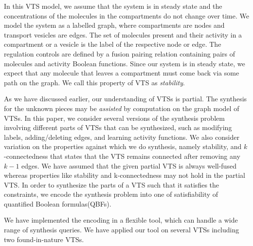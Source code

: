 %
In this VTS model, we assume that the system is in steady state and the
concentrations of the molecules in the compartments do not change over
time.
%
We model the system as a labelled graph, where compartments are nodes and
transport vesicles are edges.
%
The set of molecules present and their activity in a compartment or
a vesicle is the label of the respective node or edge.
%
The regulation controls are defined by a fusion pairing relation
containing pairs of molecules and activity
Boolean functions.
%
Since our system is in steady state, we expect that any molecule that
leaves a compartment must come back via some path on the graph.
%
We call this property of VTS as {\em stability}.

%
As we have discussed earlier, our understanding of VTSs is partial.
%
%
%
%
The synthesis for the unknown pieces may be {\em assisted} by computation on
the graph model of VTSs.
%
In this paper, we consider several versions of the synthesis problem
involving different parts of VTSs that can be synthesized, such as
modifying labels, adding/deleting edges, and learning activity functions.
%
We also consider variation on the properties against which we do
synthesis, namely stability, and $k$-connectedness that states that the VTS remains connected after removing any $k-1$ edges.
%
We have assumed that the given partial VTS is always well-fused whereas properties like stability and k-connectedness may not hold in the partial VTS.
%
In order to synthesize the parts of a VTS such that it satisfies the
constraints, we encode the synthesis problem into one of satisfiability of
quantified Boolean formulas(QBFs). 
%

We have implemented the encoding in a flexible tool,
which can handle a wide range of synthesis queries.
%
We have applied our tool on several VTSs including two found-in-nature
VTSs.
%
% 

